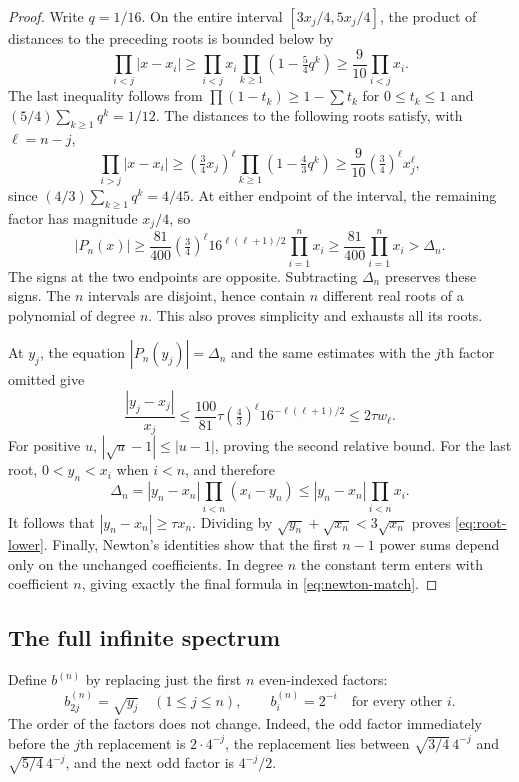 \documentclass[11pt,a4paper]{article}
\numberwithin{equation}{section}
\theoremstyle{definition}
\theoremstyle{remark}
\begin{document}
\begin{proof}
Write $q=1/16$. On the entire interval $[3x_j/4,5x_j/4]$, the product
of distances to the preceding roots is bounded below by
\[
 \prod_{i<j}|x-x_i|
 \ge\prod_{i<j}x_i\prod_{k\ge1}(1-\tfrac54q^k)
 \ge\frac9{10}\prod_{i<j}x_i.
\]
The last inequality follows from
$\prod(1-t_k)\ge1-\sum t_k$ for $0\le t_k\le1$ and
$(5/4)\sum_{k\ge1}q^k=1/12$.
The distances to the following roots satisfy, with $\ell=n-j$,
\[
 \prod_{i>j}|x-x_i|
 \ge(\tfrac34 x_j)^\ell
       \prod_{k\ge1}(1-\tfrac43q^k)
 \ge\frac9{10}(\tfrac34)^\ell x_j^\ell,
\]
since $(4/3)\sum_{k\ge1}q^k=4/45$.
At either endpoint of the interval, the remaining factor has magnitude
$x_j/4$, so
\begin{equation}
 |P_n(x)|
 \ge\frac{81}{400}(\tfrac34)^\ell
             16^{\ell(\ell+1)/2}\prod_{i=1}^nx_i
 \ge\frac{81}{400}\prod_{i=1}^nx_i>\Delta_n.
 \label{eq:bracket-sign}
\end{equation}
The signs at the two endpoints are opposite. Subtracting $\Delta_n$ preserves
these signs. The $n$ intervals are disjoint, hence contain $n$ different real
roots of a polynomial of degree $n$. This also proves simplicity and exhausts
all its roots.

At $y_j$, the equation $|P_n(y_j)|=\Delta_n$ and the same estimates with
the $j$th factor omitted give
\[
 \frac{|y_j-x_j|}{x_j}
 \le\frac{100}{81}\tau(\tfrac43)^\ell16^{-\ell(\ell+1)/2}
 \le2\tau w_\ell.
\]
For positive $u$, $|\sqrt{u}-1|\le|u-1|$, proving the second relative bound.
For the last root, $0<y_n<x_i$ when $i<n$, and therefore
\[
 \Delta_n=|y_n-x_n|\prod_{i<n}(x_i-y_n)
 \le |y_n-x_n|\prod_{i<n}x_i.
\]
It follows that $|y_n-x_n|\ge\tau x_n$. Dividing by
$\sqrt{y_n}+\sqrt{x_n}<3\sqrt{x_n}$ proves \eqref{eq:root-lower}.
Finally, Newton's identities show that the first $n-1$ power sums depend
only on the unchanged coefficients. In degree $n$ the constant term enters
with coefficient $n$, giving exactly the final formula in
\eqref{eq:newton-match}.
\end{proof}

\subsection{The full infinite spectrum}

Define $b^{(n)}$ by replacing just the first $n$ even-indexed factors:
\begin{equation}
 b^{(n)}_{2j}=\sqrt{y_j}\quad(1\le j\le n),
 \qquad b^{(n)}_i=2^{-i}\quad\text{for every other }i.
 \label{eq:b-spectrum}
\end{equation}
The order of the factors does not change. Indeed, the odd factor immediately
before the $j$th replacement is $2\cdot4^{-j}$, the replacement lies between
$\sqrt{3/4}\,4^{-j}$ and $\sqrt{5/4}\,4^{-j}$, and the next odd factor is
$4^{-j}/2$.
\end{document}
